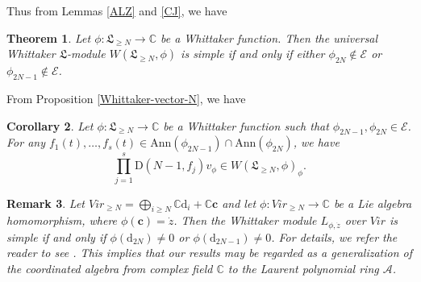 \documentclass[12pt, a4paper]{amsart}
\newcommand{\C}{\mathbb{C}}
\newcommand{\rd}{\mathrm{d}}
\newcommand{\rD}{\mathrm{D}}
\theoremstyle{Theorem}
\theoremstyle{Theorem}
\newtheorem{thm}{Theorem}[section]
\newtheorem{corollary}[thm]{Corollary}
\newtheorem{remark}[thm]{Remark}
\numberwithin{equation}{section}
\begin{document}
Thus from Lemmas \ref{ALZ} and \ref{CJ}, we have
\begin{thm}\label{Vir-Whittaker-module}Let $\phi:\mathfrak{L}_{\geq N}\rightarrow\C$ be a Whittaker function.
Then the universal Whittaker $\mathfrak{L}$-module $W(\mathfrak{L}_{\geq N},\phi)$ is simple if and only if either $\phi_{2N}\notin\mathcal{E}$ or
$\phi_{2N-1}\notin\mathcal{E}$.
\end{thm}
From Proposition \ref{Whittaker-vector-N}, we have
\begin{corollary}
Let $\phi:\mathfrak{L}_{\geq N}\rightarrow\C$ be a Whittaker function
such that $\phi_{2N-1},\phi_{2N}\in\mathcal{E}$. For any
$f_{1}(t),\dots, f_{s}(t)\in\mathrm{Ann}(\phi_{2N-1})\cap\mathrm{Ann}(\phi_{2N})$, we have
\[\prod_{j=1}^{s}\rD(N-1,f_{j})v_{\phi}\in W(\mathfrak{L}_{\geq N},\phi)_{\phi}.\]
\end{corollary}

\begin{remark}
Let $Vir_{\geq N}=\bigoplus_{i\geq N}\C\rd_{i}+\C\bm{c}$ and
let $\phi:Vir_{\geq N}\rightarrow\C$ be a Lie algebra homomorphism, where $\phi(\bm{c})=\dot{z}$. Then the Whittaker module
$L_{\phi,\dot{z}}$ over $Vir$ is simple if and only if $\phi(\rd_{2N})\neq0$ or $\phi(\rd_{2N-1})\neq0$.
For details, we refer the reader to see \cite[Theorem 7]{LGZ}.
This implies that our results may be regarded as a generalization of the coordinated algebra
from complex field $\C$ to the Laurent polynomial ring $\mathcal{A}$.
\end{remark}
\end{document}

